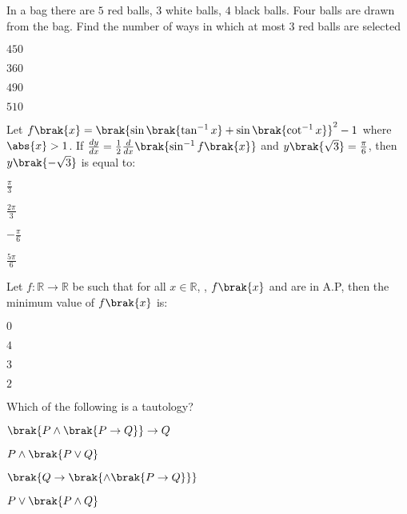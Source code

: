 \item In a bag there are $5$ red balls, $3$ white balls, $4$ black balls. Four balls are drawn from the bag. Find the number of ways in which at most $3$ red balls are selected

\hfill{}
\begin{enumerate}
\begin{multicols}{4}
\item $450$
\item $360$
\item $490$
\item $510$
\end{multicols}
\end{enumerate}

\item Let $f\brak{x}=\brak{\sin\brak{{\tan^{-1}x}}+\sin\brak{{\cot^{-1}x}}}^2-1$ where $\abs{x}>1$. If $\frac{dy}{dx}=\frac{1}{2}\frac{d}{dx}\brak{\sin^{-1}f\brak{x}}$ and $y\brak{\sqrt{3}}=\frac{\pi}{6}$, then $y\brak{-\sqrt{3}}$ is equal to:

\hfill{}
\begin{enumerate}
\begin{multicols}{4}
\item $\frac{\pi}{3}$
\item $\frac{2\pi}{3}$
\item $-\frac{\pi}{6}$
\item $\frac{5\pi}{6}$
\end{multicols}
\end{enumerate}

\item Let $f:\mathbb{R}\rightarrow\mathbb{R}$ be such that for all $x\in\mathbb{R}$, , $f\brak{x}$ and  are in A.P, then the minimum value of $f\brak{x}$ is:

\hfill{}
\begin{enumerate}
\begin{multicols}{4}
\item $0$
\item $4$
\item $3$
\item $2$
\end{multicols}
\end{enumerate}

\item Which of the following is a tautology?

\hfill{}
\begin{enumerate}
\begin{multicols}{2}
\item $\brak{P\wedge\brak{P\rightarrow Q}}\rightarrow Q$
\item $P\wedge \brak{P\vee Q}$
\item $\brak{Q\rightarrow\brak{\wedge\brak{P\rightarrow Q}}}$
\item $P\vee \brak{P\wedge Q}$
\end{multicols}
\end{enumerate}

